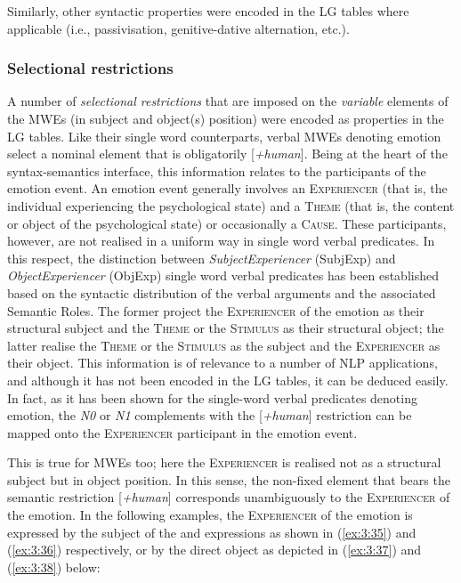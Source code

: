 \documentclass[output=paper]{langsci/langscibook}
\begin{document}
Similarly, other syntactic properties were encoded in the LG tables 
where applicable (i.e., passivisation, genitive-dative alternation,
etc.).


\subsubsection{Selectional restrictions}

Α number of \textit{selectional restrictions} that are imposed on
the \textit{variable} elements of the  MWEs (in subject and
object(s) position) were encoded as properties in the 
LG tables. Like
their single word counterparts, verbal MWEs denoting emotion select a
nominal element that is obligatorily [\textit{+human}]. Being at the
heart of the syntax-semantics interface, this information relates to
the participants of the emotion event. An emotion event generally
involves an \textsc{Experiencer} (that is, the individual experiencing
the psychological state) and a \textsc{Theme} (that is, the content or
object of the psychological state) or \textendash{} occasionally \textendash{} a
\textsc{Cause.} These participants, however, are not realised in a
uniform way in single word verbal predicates. In this respect, the
distinction between  \textit{SubjectExperiencer} (SubjExp)
and  \textit{ObjectExperiencer} (ObjExp) single word verbal
predicates has been established \citep{beletti1998} based on the
syntactic distribution of the verbal arguments and the associated
Semantic Roles. The former project the  \textsc{Experiencer} of the
emotion as their structural subject and the
\textsc{Theme} or the
\textsc{Stimulus} as their structural object; the latter realise the
\textsc{Theme} or the \textsc{Stimulus} as the subject and the
\textsc{Experiencer} as their object. This information is of relevance
to a number of NLP applications, and although it has not been encoded
in the LG tables, it can be deduced easily. In fact, as it has been
shown \citep{giouli2014} for the single-word verbal predicates
denoting emotion, the \textit{N0} or \textit{N1} complements with the
[\textit{+human}] restriction can be mapped onto the
\textsc{Experiencer} participant in the emotion event.



This is  true for MWEs too; here the \textsc{Experiencer} is
realised not as a structural subject but in object position. In this
sense, the non-fixed element that bears the semantic restriction
[\textit{+human}] corresponds unambiguously to the \textsc{Experiencer}
of the emotion. In the following examples, the \textsc{Experiencer} of
the emotion is expressed by the subject of the  and  expressions as
shown in (\ref{ex:3:35}) and (\ref{ex:3:36}) respectively, or by the direct object as
depicted in (\ref{ex:3:37}) and (\ref{ex:3:38}) below:
\end{document}
